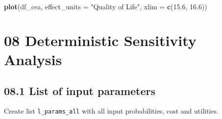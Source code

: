 \documentclass[
]{article}
\newenvironment{Shaded}{\begin{snugshade}}{\end{snugshade}}
\newcommand{\DataTypeTok}[1]{\textcolor[rgb]{0.13,0.29,0.53}{#1}}
\newcommand{\FloatTok}[1]{\textcolor[rgb]{0.00,0.00,0.81}{#1}}
\newcommand{\KeywordTok}[1]{\textcolor[rgb]{0.13,0.29,0.53}{\textbf{#1}}}
\newcommand{\NormalTok}[1]{#1}
\newcommand{\StringTok}[1]{\textcolor[rgb]{0.31,0.60,0.02}{#1}}
\begin{document}
\begin{Shaded}
\begin{Highlighting}[]
\KeywordTok{plot}\NormalTok{(df_cea, }\DataTypeTok{effect_units =} \StringTok{"Quality of Life"}\NormalTok{, }\DataTypeTok{xlim =} \KeywordTok{c}\NormalTok{(}\FloatTok{15.6}\NormalTok{, }\FloatTok{16.6}\NormalTok{))}
\end{Highlighting}
\end{Shaded}

\hypertarget{deterministic-sensitivity-analysis}{%
\section{08 Deterministic Sensitivity
Analysis}\label{deterministic-sensitivity-analysis}}

\hypertarget{list-of-input-parameters}{%
\subsection{08.1 List of input
parameters}\label{list-of-input-parameters}}

Create list \texttt{l\_params\_all} with all input probabilities, cost
and utilities.
\end{document}
